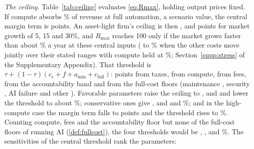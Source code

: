\emph{The ceiling.} Table~\ref{tab:ceiling} evaluates \eqref{eq:Rmax}, holding output prices fixed. If compute absorbs \CcCen\% of revenue at full automation, a scenario value, the central margin term is \MarginCen{} points. An asset-light firm's ceiling is then \CeilCenFive, \CeilCenFifteen{} and \CeilCenThirty{} points for market growth of 5, 15 and 30\%, and $R_{\max}$ reaches 100 only if the market grows faster than about \GstarCenOne\% a year at these central inputs (\StGstarCcSixMin{} to \StGstarCcSixMax\% when the other costs move jointly over their stated ranges with compute held at \CcCen\%; Section~\ref{supp:stress} of the Supplementary Appendix). That threshold is $\tau+(1-\tau)(c_c+f+a_{\min}+c_{\mathrm{full}})$: \GdecTax{} points from taxes, \GdecCompute{} from compute, \GdecFees{} from fees, \GdecAcc{} from the accountability band and \GdecFull{} from the full-cost floors (maintenance \GdecMnt, security \GdecSec, AI failure \GdecErr{} and other \GdecAnc). Favorable parameters raise the ceiling to \CeilFavFive, \CeilFavFifteen{} and \CeilFavThirty{} and lower the threshold to about \GstarFav\%; conservative ones give \CeilConsFive, \CeilConsFifteen{} and \CeilConsThirty{} and \GstarCons\%; and in the high-compute case the margin term falls to \MarginHighR{} points and the threshold rises to \GstarHigh\%. Counting compute, fees and the accountability floor but none of the full-cost floors of running AI (\autoref{def:fullcost}), the four thresholds would be \GstarAccFav, \GstarAccCen, \GstarAccCons{} and \GstarAccHigh\%. The sensitivities of the central threshold rank the parameters:

